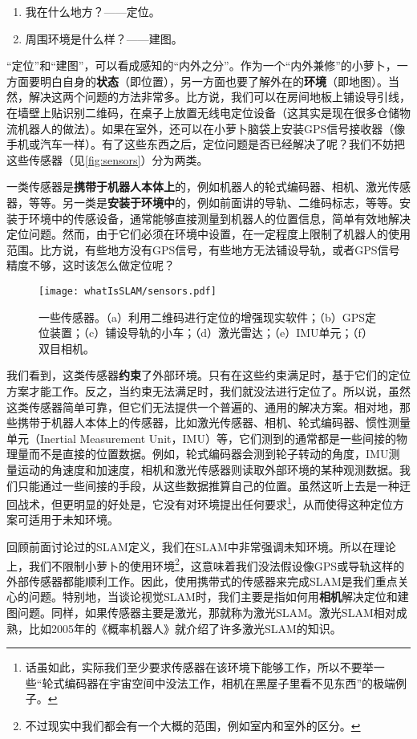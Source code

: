 \begin{enumerate}
	\item 我在什么地方？——定位。
	\item 周围环境是什么样？——建图。
\end{enumerate}

“定位”和“建图”，可以看成感知的“内外之分”。作为一个“内外兼修”的小萝卜，一方面要明白自身的\textbf{状态}（即位置），另一方面也要了解外在的\textbf{环境}（即地图）。当然，解决这两个问题的方法非常多。比方说，我们可以在房间地板上铺设导引线，在墙壁上贴识别二维码，在桌子上放置无线电定位设备（这其实是现在很多仓储物流机器人的做法）。如果在室外，还可以在小萝卜脑袋上安装GPS信号接收器（像手机或汽车一样）。有了这些东西之后，定位问题是否已经解决了呢？我们不妨把这些传感器（见\autoref{fig:sensors}）分为两类。

一类传感器是\textbf{携带于机器人本体上}的，例如机器人的轮式编码器、相机、激光传感器，等等。另一类是\textbf{安装于环境中}的，例如前面讲的导轨、二维码标志，等等。安装于环境中的传感设备，通常能够直接测量到机器人的位置信息，简单有效地解决定位问题。然而，由于它们必须在环境中设置，在一定程度上限制了机器人的使用范围。比方说，有些地方没有GPS信号，有些地方无法铺设导轨，或者GPS信号精度不够，这时该怎么做定位呢？

\begin{figure}[!ht]
	\centering
	\texttt{[image: whatIsSLAM/sensors.pdf]}
	\caption{一些传感器。（a）利用二维码进行定位的增强现实软件；（b）GPS定位装置；（c）铺设导轨的小车；（d）激光雷达；（e）IMU单元；（f）双目相机。}
	\label{fig:sensors}
\end{figure}

我们看到，这类传感器\textbf{约束}了外部环境。只有在这些约束满足时，基于它们的定位方案才能工作。反之，当约束无法满足时，我们就没法进行定位了。所以说，虽然这类传感器简单可靠，但它们无法提供一个普遍的、通用的解决方案。相对地，那些携带于机器人本体上的传感器，比如激光传感器、相机、轮式编码器、惯性测量单元（Inertial Measurement Unit，IMU）等，它们测到的通常都是一些间接的物理量而不是直接的位置数据。例如，轮式编码器会测到轮子转动的角度，IMU测量运动的角速度和加速度，相机和激光传感器则读取外部环境的某种观测数据。我们只能通过一些间接的手段，从这些数据推算自己的位置。虽然这听上去是一种迂回战术，但更明显的好处是，它没有对环境提出任何要求\footnote{话虽如此，实际我们至少要求传感器在该环境下能够工作，所以不要举一些“轮式编码器在宇宙空间中没法工作，相机在黑屋子里看不见东西”的极端例子。}，从而使得这种定位方案可适用于未知环境。

回顾前面讨论过的SLAM定义，我们在SLAM中非常强调未知环境。所以在理论上，我们不限制小萝卜的使用环境\footnote{不过现实中我们都会有一个大概的范围，例如室内和室外的区分。}，这意味着我们没法假设像GPS或导轨这样的外部传感器都能顺利工作。因此，使用携带式的传感器来完成SLAM是我们重点关心的问题。特别地，当谈论视觉SLAM时，我们主要是指如何用\textbf{相机}解决定位和建图问题。同样，如果传感器主要是激光，那就称为激光SLAM。激光SLAM相对成熟，比如2005年的《概率机器人》\textsuperscript{\cite{Thrun2005}}就介绍了许多激光SLAM的知识。

